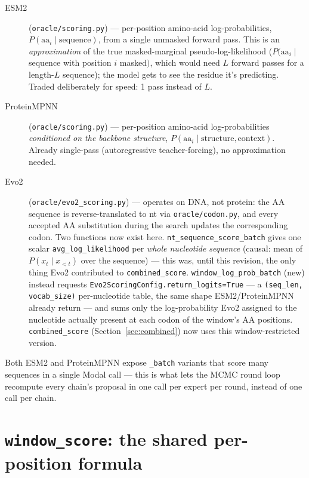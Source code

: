 \documentclass[11pt]{article}
\begin{document}
\begin{description}
  \item[ESM2] (\texttt{oracle/scoring.py}) --- per-position amino-acid
    log-probabilities, $P(\text{aa}_i \mid \text{sequence})$, from a single
    unmasked forward pass. This is an \emph{approximation} of the true
    masked-marginal pseudo-log-likelihood ($P(\text{aa}_i \mid$ sequence with
    position $i$ masked$)$, which would need $L$ forward passes for a
    length-$L$ sequence); the model gets to see the residue it's predicting.
    Traded deliberately for speed: 1 pass instead of $L$.
  \item[ProteinMPNN] (\texttt{oracle/scoring.py}) --- per-position
    amino-acid log-probabilities \emph{conditioned on the backbone
    structure}, $P(\text{aa}_i \mid \text{structure}, \text{context})$.
    Already single-pass (autoregressive teacher-forcing), no approximation
    needed.
  \item[Evo2] (\texttt{oracle/evo2\_scoring.py}) --- operates on DNA, not
    protein: the AA sequence is reverse-translated to nt via
    \texttt{oracle/codon.py}, and every accepted AA substitution during the
    search updates the corresponding codon. Two functions now exist here.
    \texttt{nt\_sequence\_score\_batch} gives one scalar
    \texttt{avg\_log\_likelihood} per \emph{whole nucleotide sequence}
    (causal: mean of $P(x_t \mid x_{<t})$ over the sequence) --- this was,
    until this revision, the only thing Evo2 contributed to
    \texttt{combined\_score}. \texttt{window\_log\_prob\_batch} (new) instead
    requests \texttt{Evo2ScoringConfig.return\_logits=True} --- a
    \texttt{(seq\_len, vocab\_size)} per-nucleotide table, the same shape
    ESM2/ProteinMPNN already return --- and sums only the log-probability
    Evo2 assigned to the nucleotide actually present at each codon of the
    window's AA positions. \texttt{combined\_score} (Section~\ref{sec:combined})
    now uses this window-restricted version.
\end{description}

Both ESM2 and ProteinMPNN expose \texttt{\_batch} variants that score many
sequences in a single Modal call --- this is what lets the MCMC round loop
recompute every chain's proposal in one call per expert per round, instead of
one call per chain.

\section{\texttt{window\_score}: the shared per-position formula}
\label{sec:window}
\end{document}

